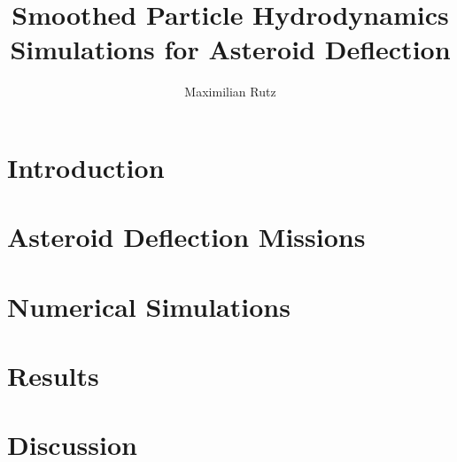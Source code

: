 \documentclass{article}
\title{Smoothed Particle Hydrodynamics Simulations for Asteroid Deflection}
\author{Maximilian Rutz}
\date{}
\begin{document}
\maketitle
\begin{abstract}
   
\end{abstract}

\newpage
\tableofcontents

\newpage
\section{Introduction}

\newpage
\section{Asteroid Deflection Missions}

\newpage
\section{Numerical Simulations}

\newpage
\section{Results}

\newpage
\section{Discussion}


\newpage
\printbibliography
\end{document}
